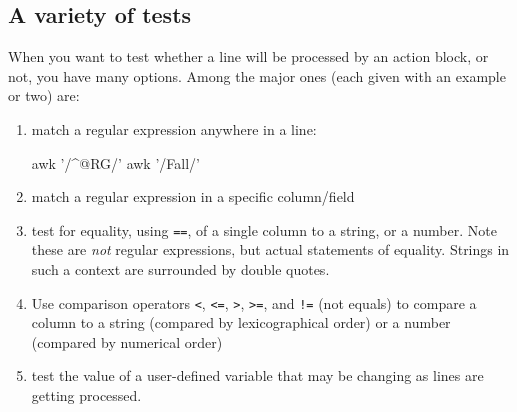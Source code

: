 \documentclass[]{krantz}
\makeatletter
\newenvironment{Shaded}{\begin{snugshade}}{\end{snugshade}}
\newcommand{\FunctionTok}[1]{\textcolor[rgb]{0,0,0}{#1}}
\newcommand{\StringTok}[1]{\textcolor[rgb]{0.5,0.5,0.5}{#1}}
\newenvironment{kframe}{%
\medskip{}
\setlength{\fboxsep}{.8em}
 \def\at@end@of@kframe{}%
 \ifinner\ifhmode%
  \def\at@end@of@kframe{\end{minipage}}%
  \begin{minipage}{\columnwidth}%
 \fi\fi%
 \def\FrameCommand##1{\hskip\@totalleftmargin \hskip-\fboxsep
 \colorbox{shadecolor}{##1}\hskip-\fboxsep
     \hskip-\linewidth \hskip-\@totalleftmargin \hskip\columnwidth}%
 \MakeFramed {\advance\hsize-\width
   \@totalleftmargin\z@ \linewidth\hsize
   \@setminipage}}%
 {\par\unskip\endMakeFramed%
 \at@end@of@kframe}
\renewenvironment{Shaded}{\begin{kframe}}{\end{kframe}}
\makeatother
\begin{document}
\hypertarget{a-variety-of-tests}{%
\subsection{A variety of tests}\label{a-variety-of-tests}}

When you want to test whether a line will be processed by an action block, or not,
you have many options. Among the major ones (each given with an example or two) are:

\begin{enumerate}
\def\labelenumi{\arabic{enumi}.}
\item
  match a regular expression anywhere in a line:

\begin{Shaded}
\begin{Highlighting}[]
\FunctionTok{awk} \StringTok{'/^@RG/'}
\FunctionTok{awk} \StringTok{'/Fall/'}
\end{Highlighting}
\end{Shaded}
\item
  match a regular expression in a specific column/field

\begin{Shaded}
\end{Shaded}
\item
  test for equality, using \texttt{==}, of a single column to a string, or a number. Note
  these are \emph{not} regular expressions, but actual statements of equality. Strings in
  such a context are surrounded by double quotes.

\begin{Shaded}
\end{Shaded}
\item
  Use comparison operators \texttt{\textless{}}, \texttt{\textless{}=}, \texttt{\textgreater{}}, \texttt{\textgreater{}=}, and \texttt{!=} (not equals) to compare
  a column to a string (compared by lexicographical order) or a number
  (compared by numerical order)

\begin{Shaded}
\end{Shaded}
\item
  test the value of a user-defined variable that may be changing as lines are getting
  processed.


\end{enumerate}
\end{document}
